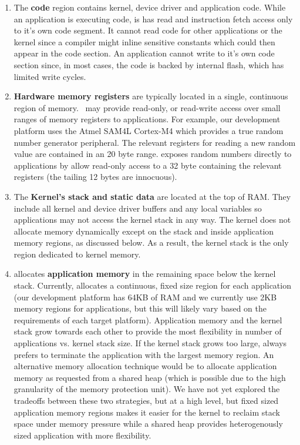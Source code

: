 \begin{enumerate}
  \item The {\bf code} region contains kernel, device driver and application
    code. While an application is executing code, is has read and instruction
    fetch access only to it's own code segment. It cannot read code for other
    applications or the kernel since a compiler might inline sensitive constants
    which could then appear in the code section. An application cannot write to
    it's own code section since, in most cases, the code is backed by internal
    flash, which has limited write cycles.

  \item {\bf Hardware memory registers} are typically located in a single,
    continuous region of memory.~ \name may provide
    read-only, or read-write access over small ranges of memory registers to
    applications. For example, our development platform uses the Atmel SAM4L
    Cortex-M4 which provides a true random number generator peripheral. The
    relevant registers for reading a new random value are contained in an 20
    byte range.  \name exposes random numbers directly to applications by allow
    read-only access to a 32 byte containing the relevant registers (the tailing
    12 bytes are innocuous).

  \item The {\bf Kernel's stack and static data} are located at the top of RAM.
    They include all kernel and device driver buffers and any local variables so
    applications may not access the kernel stack in any way. The kernel does not
    allocate memory dynamically except on the stack and inside application
    memory regions, as discussed below. As a result, the kernel stack is the
    only region dedicated to kernel memory.

  \item \name allocates {\bf application memory} in the remaining space below
    the kernel stack. Currently, \name allocates a continuous, fixed size region
    for each application (our development platform has 64KB of RAM and we
    currently use 2KB memory regions for applications, but this will likely vary
    based on the requirements of each target platform). Application memory and
    the kernel stack grow towards each other to provide the most flexibility in
    number of applications vs. kernel stack size. If the kernel stack grows too
    large, \name always prefers to terminate the application with the largest
    memory region. An alternative memory allocation technique would be to
    allocate application memory as requested from a shared heap (which is
    possible due to the high granularity of the memory protection unit). We have
    not yet explored the tradeoffs between these two strategies, but at a high
    level, but fixed sized application memory regions makes it easier for the
    kernel to reclaim stack space under memory pressure while a shared heap
    provides heterogenously sized application with more flexibility.


\end{enumerate}
